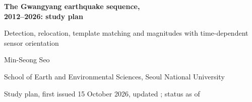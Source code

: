 \documentclass[11pt,a4paper]{article}
\begin{document}
\begin{center}
{\sffamily\bfseries\LARGE\color{headblue} The Gwangyang earthquake sequence,\\[2pt] 2012--2026: study plan\par}
\vspace{4pt}
{\sffamily\large Detection, relocation, template matching and magnitudes with time-dependent sensor orientation\par}
\vspace{8pt}
{\normalsize Min-Seong Seo\par}
{\small School of Earth and Environmental Sciences, Seoul National University\par}
\vspace{2pt}
{\small Study plan, first issued 15 October 2026, updated ; status as of \par}
\end{center}
\end{document}
